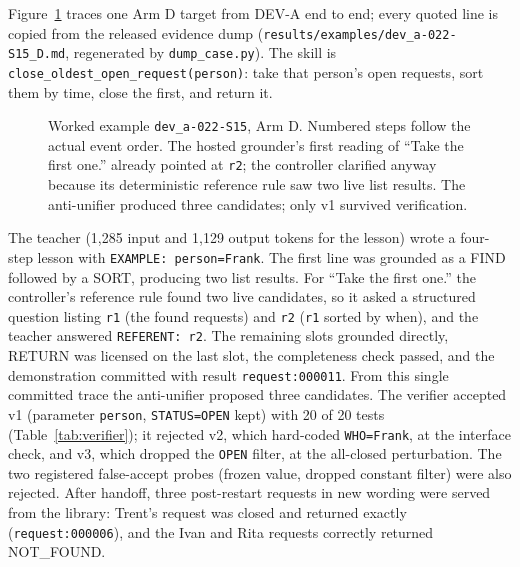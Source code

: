 \documentclass[10pt]{article}
\newcommand{\id}[1]{\nolinkurl{#1}}
\begin{document}
Figure~\ref{fig:s15} traces one Arm D target from DEV-A end to end; every quoted line is copied from the released evidence dump (\id{results/examples/dev_a-022-S15_D.md}, regenerated by \id{dump_case.py}). The skill is \id{close_oldest_open_request(person)}: take that person's open requests, sort them by time, close the first, and return it.

\begin{figure}[p]
\centering
\resizebox{\linewidth}{!}{}
\caption{Worked example \id{dev_a-022-S15}, Arm D. Numbered steps follow the actual event order. The hosted grounder's first reading of ``Take the first one.'' already pointed at \id{r2}; the controller clarified anyway because its deterministic reference rule saw two live list results. The anti-unifier produced three candidates; only v1 survived verification.}
\label{fig:s15}
\end{figure}

The teacher (1{,}285 input and 1{,}129 output tokens for the lesson) wrote a four-step lesson with \texttt{EXAMPLE: person=Frank}. The first line was grounded as a FIND followed by a SORT, producing two list results. For ``Take the first one.'' the controller's reference rule found two live candidates, so it asked a structured question listing \id{r1} (the found requests) and \id{r2} (\id{r1} sorted by when), and the teacher answered \texttt{REFERENT: r2}. The remaining slots grounded directly, RETURN was licensed on the last slot, the completeness check passed, and the demonstration committed with result \id{request:000011}. From this single committed trace the anti-unifier proposed three candidates. The verifier accepted v1 (parameter \id{person}, \id{STATUS=OPEN} kept) with 20 of 20 tests (Table~\ref{tab:verifier}); it rejected v2, which hard-coded \id{WHO=Frank}, at the interface check, and v3, which dropped the \id{OPEN} filter, at the all-closed perturbation. The two registered false-accept probes (frozen value, dropped constant filter) were also rejected. After handoff, three post-restart requests in new wording were served from the library: Trent's request was closed and returned exactly (\id{request:000006}), and the Ivan and Rita requests correctly returned NOT\_FOUND.

\begin{table}[t]
\centering\small
\caption{Verifier tests for the accepted candidate in the worked example.}
\label{tab:verifier}
\resizebox{\linewidth}{!}{}
\end{table}
\end{document}
